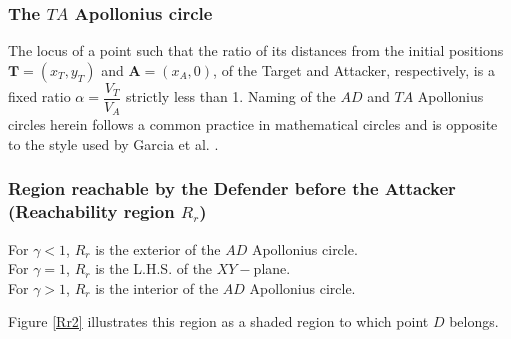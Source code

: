 \documentclass[final,5p,times,twocolumn]{elsarticle}
\begin{document}
\subsubsection{The $TA$ Apollonius circle} 
The locus of a point such that the ratio of its distances from the initial positions $\boldsymbol{T}=(x_{T},y_{T})$ and $\boldsymbol{A}=(x_{A},0)$, of the Target and Attacker, respectively, is a fixed ratio $\alpha= \dfrac{V_{T}}{V_{A}}$ strictly less than 1. Naming of the $AD$ and $TA$ Apollonius circles herein follows a common practice in mathematical circles \cite{ayoub2003proving,ayoub2006circle,partensky2008circle} and is opposite to the style used by Garcia et al. \cite{pachter2014active,garcia2015active,garcia2015escape}.

\subsubsection{Region reachable by the Defender before the Attacker (Reachability region $R_r$)}
For $\gamma<1$, $R_r$ is the exterior of the $AD$ Apollonius circle.\\
For $\gamma=1$, $R_r$ is the L.H.S. of the $XY-$plane.\\
For $\gamma>1$, $R_r$ is the interior of the $AD$ Apollonius circle. 

Figure \ref{Rr2} illustrates this region as a shaded region to which point $D$ belongs.
\end{document}
